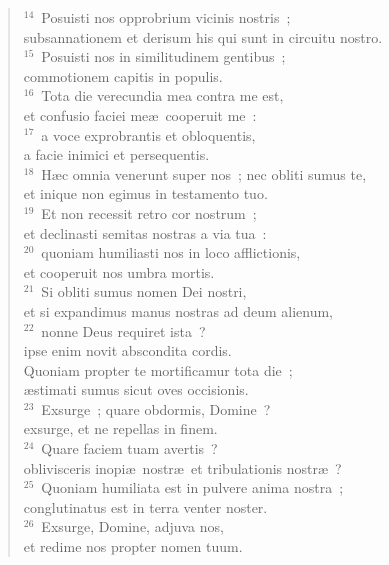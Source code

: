 \begin{flushleft}
\begin{verse}
${}^{14}$~Posuisti nos opprobrium vicinis nostris~;\\ subsannationem et derisum his qui sunt in circuitu nostro.\\
${}^{15}$~Posuisti nos in similitudinem gentibus~;\\ commotionem capitis in populis.\\
${}^{16}$~Tota die verecundia mea contra me est,\\ et confusio faciei me\ae\ cooperuit me~:\\
${}^{17}$~a voce exprobrantis et obloquentis,\\ a facie inimici et persequentis.\\
${}^{18}$~H\ae c omnia venerunt super nos~; nec obliti sumus te,\\ et inique non egimus in testamento tuo.\\
${}^{19}$~Et non recessit retro cor nostrum~;\\ et declinasti semitas nostras a via tua~:\\
${}^{20}$~quoniam humiliasti nos in loco afflictionis,\\ et cooperuit nos umbra mortis.\\
${}^{21}$~Si obliti sumus nomen Dei nostri,\\ et si expandimus manus nostras ad deum alienum,\\
${}^{22}$~nonne Deus requiret ista~?\\ ipse enim novit abscondita cordis.\\ Quoniam propter te mortificamur tota die~;\\ \ae stimati sumus sicut oves occisionis.\\
${}^{23}$~Exsurge~; quare obdormis, Domine~?\\ exsurge, et ne repellas in finem.\\
${}^{24}$~Quare faciem tuam avertis~?\\ oblivisceris inopi\ae\ nostr\ae\ et tribulationis nostr\ae~?\\
${}^{25}$~Quoniam humiliata est in pulvere anima nostra~;\\ conglutinatus est in terra venter noster.\\
${}^{26}$~Exsurge, Domine, adjuva nos,\\ et redime nos propter nomen tuum.\end{verse}\end{flushleft}



